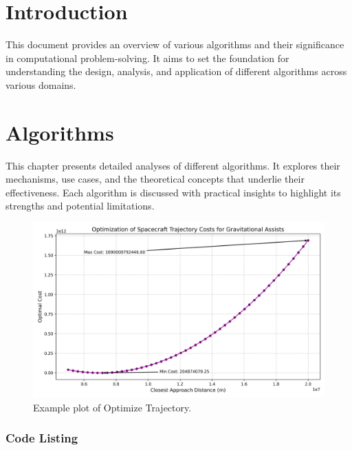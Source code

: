 \documentclass{report}%
\begin{document}
%
\normalsize%
%
\tableofcontents%
\chapter{Introduction}%
\label{chap:Introduction}%
This document provides an overview of various algorithms and their significance in computational problem{-}solving. It aims to set the foundation for understanding the design, analysis, and application of different algorithms across various domains.

%
\chapter{Algorithms}%
\label{chap:Algorithms}%
This chapter presents detailed analyses of different algorithms. It explores their mechanisms, use cases, and the theoretical concepts that underlie their effectiveness. Each algorithm is discussed with practical insights to highlight its strengths and potential limitations.

%
\newpage%
%
%


\begin{figure}[H]%
\centering%
\includegraphics[width=\textwidth]{plots/optimize_trajectory_plot.png}%
\caption{Example plot of Optimize Trajectory.}%
\end{figure}

%
\clearpage%
\subsection{Code Listing}%
\label{subsec:CodeListing}%

\end{document}
